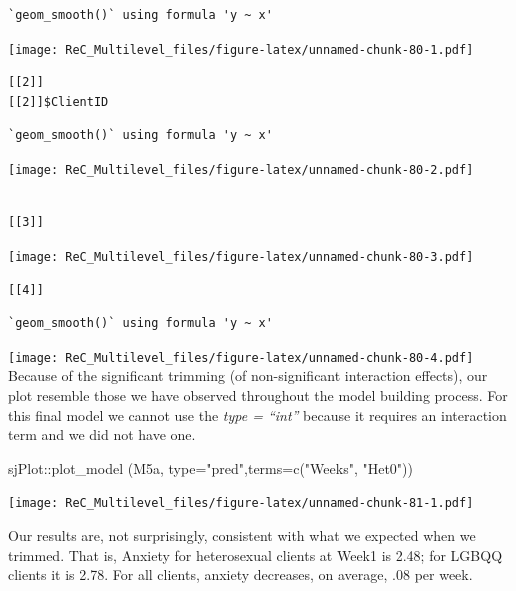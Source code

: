 \documentclass[
  english,
]{book}
\newenvironment{Shaded}{\begin{snugshade}}{\end{snugshade}}
\newcommand{\AttributeTok}[1]{\textcolor[rgb]{0.77,0.63,0.00}{#1}}
\newcommand{\FunctionTok}[1]{\textcolor[rgb]{0.00,0.00,0.00}{#1}}
\newcommand{\NormalTok}[1]{#1}
\newcommand{\SpecialCharTok}[1]{\textcolor[rgb]{0.00,0.00,0.00}{#1}}
\newcommand{\StringTok}[1]{\textcolor[rgb]{0.31,0.60,0.02}{#1}}
\begin{document}
\begin{verbatim}
`geom_smooth()` using formula 'y ~ x'
\end{verbatim}

\texttt{[image: ReC\_Multilevel\_files/figure-latex/unnamed-chunk-80-1.pdf]}

\begin{verbatim}
[[2]]
[[2]]$ClientID
\end{verbatim}

\begin{verbatim}
`geom_smooth()` using formula 'y ~ x'
\end{verbatim}

\texttt{[image: ReC\_Multilevel\_files/figure-latex/unnamed-chunk-80-2.pdf]}

\begin{verbatim}

[[3]]
\end{verbatim}

\texttt{[image: ReC\_Multilevel\_files/figure-latex/unnamed-chunk-80-3.pdf]}

\begin{verbatim}
[[4]]
\end{verbatim}

\begin{verbatim}
`geom_smooth()` using formula 'y ~ x'
\end{verbatim}

\texttt{[image: ReC\_Multilevel\_files/figure-latex/unnamed-chunk-80-4.pdf]}
Because of the significant trimming (of non-significant interaction effects), our plot resemble those we have observed throughout the model building process. For this final model we cannot use the \emph{type = ``int''} because it requires an interaction term and we did not have one.

\begin{Shaded}
\begin{Highlighting}[]
\NormalTok{sjPlot}\SpecialCharTok{::}\FunctionTok{plot\_model}\NormalTok{ (M5a, }\AttributeTok{type=}\StringTok{"pred"}\NormalTok{,}\AttributeTok{terms=}\FunctionTok{c}\NormalTok{(}\StringTok{"Weeks"}\NormalTok{, }\StringTok{"Het0"}\NormalTok{))}
\end{Highlighting}
\end{Shaded}

\texttt{[image: ReC\_Multilevel\_files/figure-latex/unnamed-chunk-81-1.pdf]}

Our results are, not surprisingly, consistent with what we expected when we trimmed. That is, Anxiety for heterosexual clients at Week1 is 2.48; for LGBQQ clients it is 2.78. For all clients, anxiety decreases, on average, .08 per week.
\end{document}
